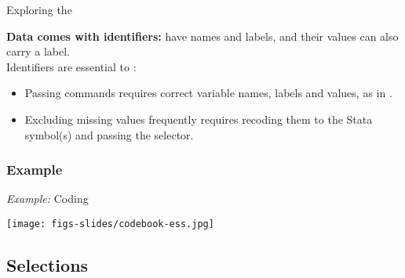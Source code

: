 \documentclass{beamer}
\begin{document}
	\begin{frame}[t]{Exploring the }
		
	\textbf{Data comes with identifiers:}  have names and labels, and their values can also carry a label.\\[1em]
	
	Identifiers are essential to :
	
		\begin{itemize}
			\item Passing commands requires correct variable names, labels and values, as in .
			
			\item Excluding missing values frequently requires recoding them to the Stata  symbol(s) and passing the  selector.
		\end{itemize}
	
	\end{frame}

	\subsubsection{Example}
	
	\begin{frame}[t]{\textit{Example:} Coding}
		\begin{center}
			\texttt{[image: figs-slides/codebook-ess.jpg]}		
		\end{center}
	\end{frame}
		

	\subsection{Selections}
	
\end{document}

